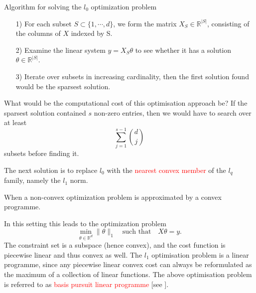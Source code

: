 \documentclass[10pt,handout,english]{beamer}
\newcommand{\R}{\mathbb{R}}
\begin{document}
\begin{frame}[allowframebreaks]
\begin{block}{Algorithm for solving the $l_0$ optimization problem}
\begin{enumerate}
\item[1)]  For each subset $S\subset \{1,\cdots,d\}$, we form the matrix $X_{S}\in\R^{\lvert S\rvert}$, consisting of the columns of $X$ indexed by S.
\item[2)] Examine the linear system $y=X_S\theta$ to see whether it has a solution $\theta\in\R^{\lvert S\rvert}$.
\item[3)] Iterate over subsets in increasing cardinality, then the first solution found would be the sparsest solution.
\end{enumerate}
\end{block}

What would be the computational cost of this optimisation approach be? If the sparsest solution contained $s$ non-zero entries, then we would have to search over at least 
\[
\sum\limits_{j=1}^{s-1}\binom{d}{j}
\]
subsets before finding it.

The next solution is to replace $l_0$ with the \textcolor{red}{nearest convex member} of the $l_q$ family, namely the $l_1$ norm. 
\begin{definition}
When a non-convex optimization problem is approximated by a convex programme.
\end{definition}
In this setting this leads to the optimization problem
\[
\min_{\theta\in\R^d}\lVert \theta\rVert_1\quad\text{such that}\quad X\theta=y.
\]
The constraint set is a subspace (hence convex), and the cost function is piecewise linear and thus convex as well. The $l_1$ optimisation problem is a linear programme, since any piecewise linear convex cost can always be reformulated as the maximum of a collection of linear functions. The above optimisation problem is referred to as \textcolor{red}{basis pursuit linear programme} [see \citet{chen1998application}].
\end{frame}
\end{document}
